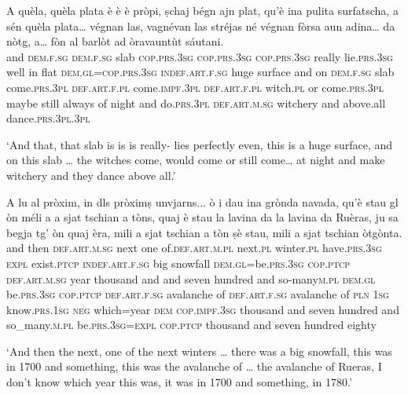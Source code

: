 \begin{linenumbers}
\gll    A quèla, quèla plata è è è pròpi, ṣchaj bégn ajn plat, qu’è ina pulita surfatscha, a sén quèla plata… végnan las, vagnévan las stréjas né végnan fòrsa aun adina… da nòtg, a… fòn al barlòt ad òravauntùt sáutani.
\\
and \textsc{dem.f.sg} \textsc{dem.f.sg} slab \textsc{cop.prs.3sg} \textsc{cop.prs.3sg} \textsc{cop.prs.3sg} really lie.\textsc{prs.3sg} well in flat \textsc{dem.gl=cop.prs.3sg} \textsc{indef.art.f.sg} huge surface and on \textsc{dem.f.sg} slab come.\textsc{prs.3pl}   \textsc{def.art.f.pl} come.\textsc{impf.3pl} \textsc{def.art.f.pl} witch.\textsc{pl} or come.\textsc{prs.3pl} maybe still always of night and do.\textsc{prs.3pl} \textsc{def.art.m.sg} witchery and above.all dance.\textsc{prs.3pl.3pl}\\
\end{linenumbers}
\medskip
\glt `And that, that slab is is is really- lies perfectly even, this is a huge surface, and on this slab … the witches come, would come or still come… at night and make witchery and they dance above all.'
\medskip

\begin{linenumbers}
\gll    A lu al pròxim, in dls pròximṣ unvjarns... ò i dau ina grònda navada, qu’è stau gl òn méli a a sjat tschian a tòns, quaj è stau la lavina da la lavina da Ruèras, ju sa begja tg’ òn quaj èra, mili a sjat tschian a tòn ṣè stau, mili a sjat tschian òtgònta.\\
and then \textsc{def.art.m.sg} next one of.\textsc{def.art.m.pl} next.\textsc{pl} winter.\textsc{pl}  have.\textsc{prs.3sg} \textsc{expl} exist.\textsc{ptcp} \textsc{indef.art.f.sg} big snowfall \textsc{dem.gl}=be.\textsc{prs.3sg} \textsc{cop.ptcp} \textsc{def.art.m.sg} year thousand and and seven hundred and   so-many\textsc{m.pl} \textsc{dem.gl} be.\textsc{prs.3sg} \textsc{cop.ptcp}  \textsc{def.art.f.sg} avalanche of \textsc{def.art.f.sg} avalanche of \textsc{pln} \textsc{1sg}  know.\textsc{prs.1sg} \textsc{neg} which=year \textsc{dem} \textsc{cop.impf.3sg} thousand and seven hundred and so\_many.\textsc{m.pl} be.\textsc{prs.3sg=expl} \textsc{cop.ptcp} thousand and seven hundred eighty\\
\end{linenumbers}
\medskip 
\glt `And then the next, one of the next winters … there was a big snowfall, this was in 1700 and something, this was the avalanche of … the avalanche of Rueras, I don’t know which year this was, it was in 1700 and something, in 1780.'
\medskip

